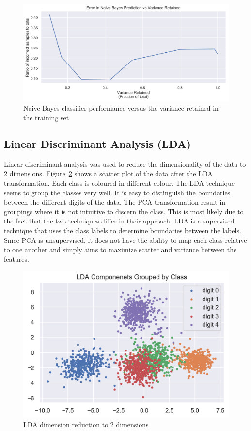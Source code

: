 \begin{figure}[htb]
 \centering
\includegraphics[width=\textwidth]{assignment1/2-4-NBprediction_line.png}
\caption{\label{fig:fig6}Naive Bayes classifier performance versus the variance retained in the training set}
\end{figure}


\clearpage{}
\subsection{Linear Discriminant Analysis (LDA)}

Linear discriminant analysis was used to reduce the dimensionality of the data to 2 dimensions. Figure~\ref{fig:fig7} shows a scatter plot of the data after the LDA transformation. Each class is coloured in different colour. The LDA technique seems to group the classes very well. It is easy to distinguish the boundaries between the different digits of the data. The PCA transformation result in groupings where it is not intuitive to discern the class. This is most likely due to the fact that the two techniques differ in their approach. LDA is a supervised technique that uses the class labels to determine boundaries between the labels. Since PCA is unsupervised, it does not have the ability to map each class relative to one another and simply aims to maximize scatter and variance between the features.

\begin{figure}[htb]
 \centering
\includegraphics[width=\textwidth]{assignment1/2-5-LDA_dim_reduction.png}
\caption{\label{fig:fig7}LDA dimension reduction to 2 dimensions}
\end{figure}